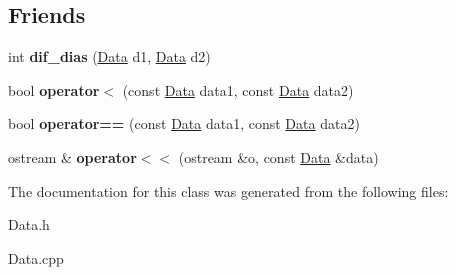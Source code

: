 \subsection*{Friends}
\begin{DoxyCompactItemize}
\item 
\hypertarget{class_data_a950a6321928619d329831ee195416f79}{int {\bfseries dif\+\_\+dias} (\hyperlink{class_data}{Data} d1, \hyperlink{class_data}{Data} d2)}\label{class_data_a950a6321928619d329831ee195416f79}

\item 
\hypertarget{class_data_a301f290080098e5d3983bdf4e870c3b9}{bool {\bfseries operator$<$} (const \hyperlink{class_data}{Data} data1, const \hyperlink{class_data}{Data} data2)}\label{class_data_a301f290080098e5d3983bdf4e870c3b9}

\item 
\hypertarget{class_data_a3cf90128ca701a628213a73c2ae1d5ea}{bool {\bfseries operator==} (const \hyperlink{class_data}{Data} data1, const \hyperlink{class_data}{Data} data2)}\label{class_data_a3cf90128ca701a628213a73c2ae1d5ea}

\item 
\hypertarget{class_data_a9daa61b4e0bee256d9481803c4778000}{ostream \& {\bfseries operator$<$$<$} (ostream \&o, const \hyperlink{class_data}{Data} \&data)}\label{class_data_a9daa61b4e0bee256d9481803c4778000}

\end{DoxyCompactItemize}


The documentation for this class was generated from the following files\+:\begin{DoxyCompactItemize}
\item 
Data.\+h\item 
Data.\+cpp\end{DoxyCompactItemize}
